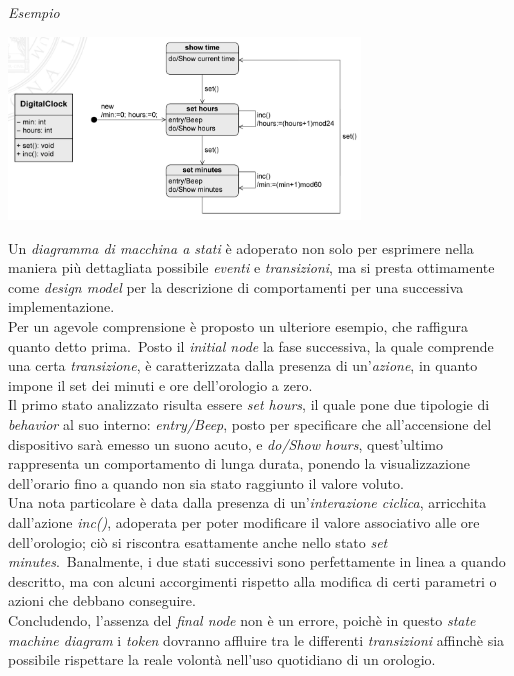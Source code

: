 \documentclass{article}
\begin{document}
\textit{Esempio}\vspace*{7pt}
\begin{center}
    \includegraphics*[width=0.7\textwidth]{foto 8.png}
\end{center}
Un \textit{diagramma di macchina a stati} è adoperato non solo per esprimere nella maniera più dettagliata possibile \textit{eventi} e \textit{transizioni}, ma si presta ottimamente come \textit{design model} per la descrizione di comportamenti per una successiva implementazione.\vspace*{14pt}\\
Per un agevole comprensione è proposto un ulteriore esempio, che raffigura quanto detto prima.\ Posto il \textit{initial node} la fase successiva, la quale comprende una certa \textit{transizione}, è caratterizzata dalla presenza di un'\textit{azione}, in quanto impone il set dei minuti e ore dell'orologio a zero.\vspace*{14pt}\\
Il primo stato analizzato risulta essere \textit{set hours}, il quale pone due tipologie di \textit{behavior} al suo interno: \textit{entry/Beep}, posto per specificare che all'accensione del dispositivo sarà emesso un suono acuto, e \textit{do/Show hours}, quest'ultimo rappresenta un comportamento di lunga durata, ponendo la visualizzazione dell'orario fino a quando non sia stato raggiunto il valore voluto.\vspace*{14pt}\\
Una nota particolare è data dalla presenza di un'\textit{interazione ciclica}, arricchita dall'azione \textit{inc()}, adoperata per poter modificare il valore associativo alle ore dell'orologio; ciò si riscontra esattamente anche nello stato \textit{set minutes}.\ 
Banalmente, i due stati successivi sono perfettamente in linea a quando descritto, ma con alcuni accorgimenti rispetto alla modifica di certi parametri o azioni che debbano conseguire.\vspace*{14pt}\\
Concludendo, l'assenza del \textit{final node} non è un errore, poichè in questo \textit{state machine diagram} i \textit{token} dovranno affluire tra le differenti \textit{transizioni} affinchè sia possibile rispettare la reale volontà nell'uso quotidiano di un orologio.
\end{document}
